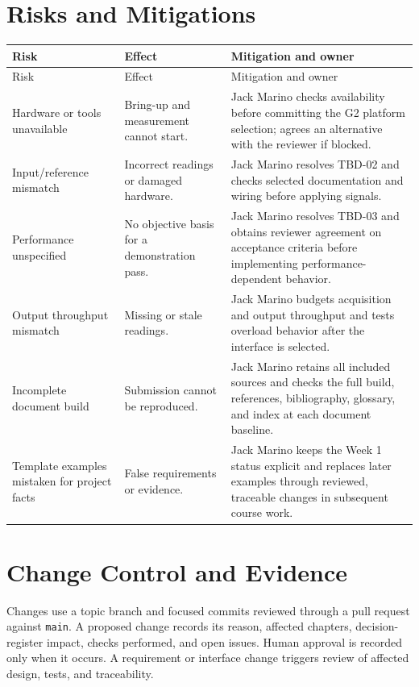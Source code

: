 \section{Risks and Mitigations}
\small
\begin{tabularx}{\linewidth}{L{2.8cm}Y Y}
\caption{Initial Project Risks\label{Table:WeekOneRisks}}\\
\toprule
Risk & Effect & Mitigation and owner\\
\midrule
\endfirsthead
\toprule
Risk & Effect & Mitigation and owner\\
\midrule
\endhead
\bottomrule
\endlastfoot
Hardware or tools unavailable & Bring-up and measurement cannot start. &
Jack Marino checks availability before committing the G2 platform selection;
agrees an alternative with the reviewer if blocked.\\
Input/reference mismatch & Incorrect readings or damaged hardware. &
Jack Marino resolves TBD-02 and checks selected documentation and wiring
before applying signals.\\
Performance unspecified & No objective basis for a demonstration pass. &
Jack Marino resolves TBD-03 and obtains reviewer agreement on acceptance
criteria before implementing performance-dependent behavior.\\
Output throughput mismatch & Missing or stale readings. &
Jack Marino budgets acquisition and output throughput and tests overload
behavior after the interface is selected.\\
Incomplete document build & Submission cannot be reproduced. &
Jack Marino retains all included sources and checks the full build,
references, bibliography, glossary, and index at each document baseline.\\
Template examples mistaken for project facts & False requirements or evidence. &
Jack Marino keeps the Week 1 status explicit and replaces later examples
through reviewed, traceable changes in subsequent course work.\\
\end{tabularx}
\normalsize

\section{Change Control and Evidence}
Changes use a topic branch and focused commits reviewed through a pull request
against \texttt{main}. A proposed change records its reason, affected chapters,
decision-register impact, checks performed, and open issues. Human approval
is recorded only when it occurs. A requirement or interface change triggers
review of affected design, tests, and traceability.


